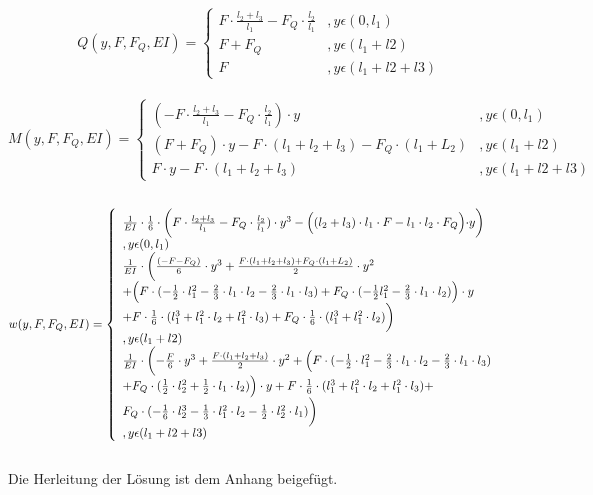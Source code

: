 \begin{equation}
	Q(y,F,F_{Q},EI)=\left\{\begin{array}{ll}
		F\cdot \frac{l_{2}+l_{3}}{l_{1}}-F_{Q}\cdot \frac{l_{2}}{l_{1}}&,y\epsilon (0,l_{1})\\
		F+F_{Q}&,y\epsilon (l_{1}+l{2})\\
		F&,y\epsilon (l_{1}+l{2}+l{3})
	\end{array}\right.
\end{equation}\\
\begin{equation}
	M(y,F,F_{Q},EI)=\left\{\begin{array}{ll}
		(-F\cdot \frac{l_{2}+l_{3}}{l_{1}}-F_{Q}\cdot \frac{l_{2}}{l_{1}})\cdot y&,y\epsilon (0,l_{1})\\
		(F+F_{Q})\cdot y - F\cdot (l_{1}+l_{2}+l_{3})-F_{Q}\cdot (l_{1}+L_{2})&,y\epsilon (l_{1}+l{2})\\
		F\cdot y - F\cdot (l_{1}+l_{2}+l_{3})&,y\epsilon (l_{1}+l{2}+l{3})
	\end{array}\right.
\end{equation}\\
\begin{equation}
	w(y,F,F_{Q},EI)=\left\{\begin{array}{ll}
		\frac{1}{EI}\cdot\frac{1}{6}\cdot\biggl(F\cdot \frac{l_{2}+l_{3}}{l_{1}}-F_{Q}\cdot \frac{l_{2}}{l_{1}})\cdot y^{3}-\Bigl((l_{2}+l_{3})\cdot l_{1}\cdot F-l_{1}\cdot l_{2}\cdot F_{Q}\Bigl)\cdot y \biggr)&\\,y\epsilon (0,l_{1})\\
		\frac{1}{EI}\cdot\biggl(\frac{(-F-F_{Q})}{6}\cdot y^{3} + \frac{F\cdot (l_{1}+l_{2}+l_{3})+F_{Q}\cdot (l_{1}+L_{2})}{2}\cdot y^{2}\\ + \Bigl(F\cdot(-\frac{1}{2}\cdot l_{1}^{2}-\frac{2}{3}\cdot l_{1}\cdot l_{2}-\frac{2}{3}\cdot l_{1}\cdot l_{3})+ F_{Q}\cdot(-\frac{1}{2}l_{1}^{2}-\frac{2}{3}\cdot l_{1}\cdot l_{2})\Bigr)\cdot y \\+ F\cdot\frac{1}{6}\cdot(l_{1}^{3}+l_{1}^{2}\cdot l_{2}+l_{1}^{2}\cdot l_{3}) + F_{Q}\cdot\frac{1}{6}\cdot(l_{1}^{3}+l_{1}^{2}\cdot l_{2})\biggr)&\\,y\epsilon (l_{1}+l{2})\\
		\frac{1}{EI}\cdot\biggl(-\frac{F}{6}\cdot y^{3} + \frac{ F\cdot (l_{1}+l_{2}+l_{3})}{2}\cdot y^{2} + \Bigl(F\cdot(-\frac{1}{2}\cdot l_{1}^{2} -\frac{2}{3}\cdot l_{1}\cdot l_{2}-\frac{2}{3}\cdot l_{1}\cdot l_{3})\\ + F_{Q}\cdot(\frac{1}{2}\cdot l_{2}^{2}+\frac{1}{2}\cdot l_{1}\cdot l_{2})\Bigr)\cdot y +F\cdot\frac{1}{6}\cdot(l_{1}^{3}+l_{1}^{2}\cdot l_{2}+l_{1}^{2}\cdot l_{3}) + \\F_{Q}\cdot(-\frac{1}{6}\cdot l_{2}^{3}-\frac{1}{3}\cdot l_{1}^{2}\cdot l_{2}-\frac{1}{2}\cdot l_{2}^{2}\cdot l_{1})\biggr)&\\,y\epsilon (l_{1}+l{2}+l{3})
	\end{array}\right.
\end{equation}\\
Die Herleitung der Lösung ist dem Anhang beigefügt.\\

